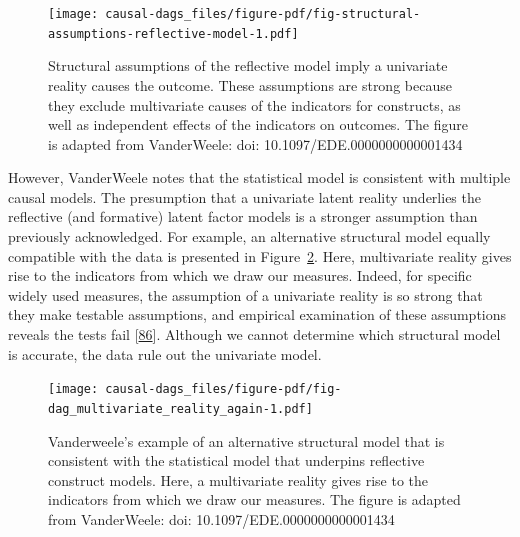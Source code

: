 \documentclass[
  singlecolumn]{article}
\begin{document}
\begin{figure}

{\centering \texttt{[image: causal-dags\_files/figure-pdf/fig-structural-assumptions-reflective-model-1.pdf]}

}

\caption{\label{fig-structural-assumptions-reflective-model}Structural
assumptions of the reflective model imply a univariate reality causes
the outcome. These assumptions are strong because they exclude
multivariate causes of the indicators for constructs, as well as
independent effects of the indicators on outcomes. The figure is adapted
from VanderWeele: doi: 10.1097/EDE.0000000000001434}

\end{figure}

However, VanderWeele notes that the statistical model is consistent with
multiple causal models. The presumption that a univariate latent reality
underlies the reflective (and formative) latent factor models is a
stronger assumption than previously acknowledged. For example, an
alternative structural model equally compatible with the data is
presented in Figure~\ref{fig-dag_multivariate_reality_again}. Here,
multivariate reality gives rise to the indicators from which we draw our
measures. Indeed, for specific widely used measures, the assumption of a
univariate reality is so strong that they make testable assumptions, and
empirical examination of these assumptions reveals the tests fail
{[}\protect\hyperlink{ref-vanderweele2022b}{86}{]}. Although we cannot
determine which structural model is accurate, the data rule out the
univariate model.

\begin{figure}

{\centering \texttt{[image: causal-dags\_files/figure-pdf/fig-dag\_multivariate\_reality\_again-1.pdf]}

}

\caption{\label{fig-dag_multivariate_reality_again}Vanderweele's example
of an alternative structural model that is consistent with the
statistical model that underpins reflective construct models. Here, a
multivariate reality gives rise to the indicators from which we draw our
measures. The figure is adapted from VanderWeele: doi:
10.1097/EDE.0000000000001434}

\end{figure}
\end{document}

